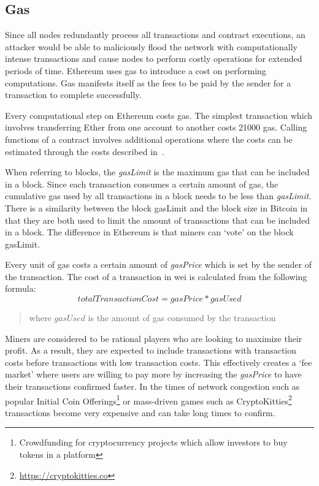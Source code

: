 \subsection{Gas} \label{gas}
Since all nodes redundantly process all transactions and contract executions, an attacker would be able to maliciously flood the network with computationally intense transactions and cause nodes to perform costly operations for extended periods of time. Ethereum uses gas to introduce a cost on performing computations. Gas manifests itself as the fees to be paid by the sender for a transaction to complete successfully.

Every computational step on Ethereum costs gas. The simplest transaction which involves transferring Ether from one account to another costs 21000 gas. Calling functions of a contract involves additional operations where the costs can be estimated through the costs described in~\cite{gas, ethereum}. 

When referring to blocks, the \textit{gasLimit} is the maximum gas that can be included in a block. Since each transaction consumes a certain amount of gas, the cumulative gas used by all transactions in a block needs to be less than \textit{gasLimit}. There is a similarity between the block gasLimit and the block size in Bitcoin in that they are both used to limit the amount of transactions that can be included in a block. The difference in Ethereum is that miners can `vote' on the block gasLimit.

Every unit of gas costs a certain amount of \textit{gasPrice} which is set by the sender of the transaction. The cost of a transaction in wei is calculated from the following formula:
\begin{equation}
    totalTransactionCost = gasPrice * gasUsed
\end{equation}
\begin{quote}
    \noindent
    where $gasUsed$ is the amount of gas consumed by the transaction
\end{quote}

Miners are considered to be rational players who are looking to maximize their profit. As a result, they are expected to include transactions with transaction costs before transactions with low transaction costs. This effectively creates a `fee market'  where users are willing to pay more by increasing the \textit{gasPrice} to have their transactions confirmed faster. In the times of network congestion such as popular Initial Coin Offerings\footnote{Crowdfunding for cryptocurrency projects which allow investors to buy tokens in a platform}\cite{batico} or mass-driven games such as CryptoKitties\footnote{\url{https://cryptokitties.co}}\cite{cryptokitties} transactions become very expensive and can take long times to confirm.

